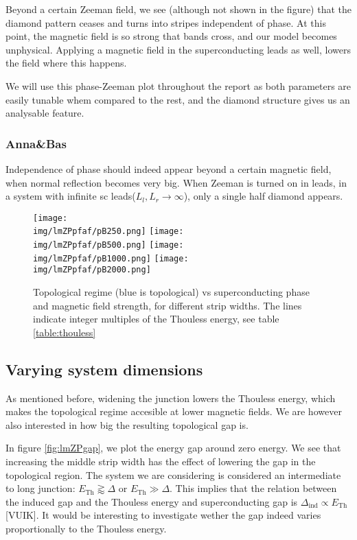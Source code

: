 \documentclass[10pt,a4paper]{article}
\newcommand{\img}{./images}
\begin{document}
		Beyond a certain Zeeman field, we see (although not shown in the figure) that the diamond pattern ceases and turns into stripes independent of phase.
		At this point, the magnetic field is so strong that bands cross, and our model becomes unphysical.
		Applying a magnetic field in the superconducting leads as well, lowers the field where this happens.
		
		We will use this phase-Zeeman plot throughout the report as both parameters are easily tunable whem compared to the rest, and the diamond structure gives us an analysable feature.
		
		\subsubsection{Anna\&Bas}
		Independence of phase should indeed appear beyond a certain magnetic field, when normal reflection becomes very big. When Zeeman is turned on in leads, in a system with infinite sc leads($L_l, L_r \rightarrow \infty$), only a single half diamond appears.
		
	\begin{figure}[H]
		\texttt{[image: \\img/lmZPpfaf/pB250.png]}
		\texttt{[image: \\img/lmZPpfaf/pB500.png]}
		\texttt{[image: \\img/lmZPpfaf/pB1000.png]}
		\texttt{[image: \\img/lmZPpfaf/pB2000.png]}
		\caption{Topological regime (blue is topological) vs superconducting phase and magnetic field strength, for different strip widths. The lines indicate integer multiples of the Thouless energy, see table \ref{table:thouless}}
		\label{fig:lmZPpfaf}
	\end{figure}

	\subsection{Varying system dimensions}
	 As mentioned before, widening the junction lowers the Thouless energy, which makes the topological regime accesible at lower magnetic fields.
	 We are however also interested in how big the resulting topological gap is.

	 
	 In figure \ref{fig:lmZPgap}, we plot the energy gap around zero energy.
	 We see that increasing the middle strip width has the effect of lowering the gap in the topological region.
	 The system we are considering is considered an intermediate to long junction: $E_\text{Th} \gtrapprox \Delta$ or $E_\text{Th} \gg \Delta$.
	 This implies that the relation between the induced gap and the Thouless energy and superconducting gap is $\Delta_\text{ind} \propto E_\text{Th}$[VUIK].
	 It would be interesting to investigate wether the gap indeed varies proportionally to the Thouless energy.
	 
\end{document}
